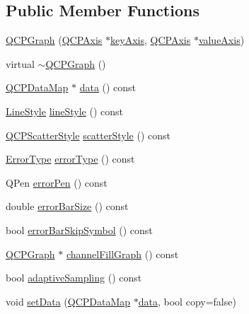 \subsection*{Public Member Functions}
\begin{DoxyCompactItemize}
\item 
\hyperlink{class_q_c_p_graph_a0393a38cf7183cbf46348eb6cf9a5a6c}{Q\+C\+P\+Graph} (\hyperlink{class_q_c_p_axis}{Q\+C\+P\+Axis} $\ast$\hyperlink{class_q_c_p_abstract_plottable_a72c7a09c22963f2c943f07112b311103}{key\+Axis}, \hyperlink{class_q_c_p_axis}{Q\+C\+P\+Axis} $\ast$\hyperlink{class_q_c_p_abstract_plottable_a3106f9d34d330a6097a8ec5905e5b519}{value\+Axis})
\item 
virtual \hyperlink{class_q_c_p_graph_ae9998cfb9d379ac0ef3fbd6995cfbd76}{$\sim$\+Q\+C\+P\+Graph} ()
\item 
\hyperlink{qcustomplot_8h_a84a9c4a4c2216ccfdcb5f3067cda76e3}{Q\+C\+P\+Data\+Map} $\ast$ \hyperlink{class_q_c_p_graph_a2f58436df4f86a2792b776a21642b3d9}{data} () const 
\item 
\hyperlink{class_q_c_p_graph_ad60175cd9b5cac937c5ee685c32c0859}{Line\+Style} \hyperlink{class_q_c_p_graph_ad6db8d31abeac256a285fc68d6b9b9be}{line\+Style} () const 
\item 
\hyperlink{class_q_c_p_scatter_style}{Q\+C\+P\+Scatter\+Style} \hyperlink{class_q_c_p_graph_ae0227c79f4e42a350c2c99fb2fb879db}{scatter\+Style} () const 
\item 
\hyperlink{class_q_c_p_graph_ad23b514404bd2cb3216f57c90904d6af}{Error\+Type} \hyperlink{class_q_c_p_graph_a250bcdf78abac87bc6d46ee6fd99a92d}{error\+Type} () const 
\item 
Q\+Pen \hyperlink{class_q_c_p_graph_a83455e01093bb899f3b59d4a6fdcd57b}{error\+Pen} () const 
\item 
double \hyperlink{class_q_c_p_graph_ae31efdcbc6ba3d73a7aeb83c774f958a}{error\+Bar\+Size} () const 
\item 
bool \hyperlink{class_q_c_p_graph_a04dbc050ff04561658ab1e7f3df37a01}{error\+Bar\+Skip\+Symbol} () const 
\item 
\hyperlink{class_q_c_p_graph}{Q\+C\+P\+Graph} $\ast$ \hyperlink{class_q_c_p_graph_a5369f23863e04a6164f8b66d49fd18f4}{channel\+Fill\+Graph} () const 
\item 
bool \hyperlink{class_q_c_p_graph_ad3bea28ec910eedfa9b788928d610de0}{adaptive\+Sampling} () const 
\item 
void \hyperlink{class_q_c_p_graph_a1df2fd710545c8ba3b2c99a39a27bf8b}{set\+Data} (\hyperlink{qcustomplot_8h_a84a9c4a4c2216ccfdcb5f3067cda76e3}{Q\+C\+P\+Data\+Map} $\ast$\hyperlink{class_q_c_p_graph_a2f58436df4f86a2792b776a21642b3d9}{data}, bool copy=false)

\end{DoxyCompactItemize}
